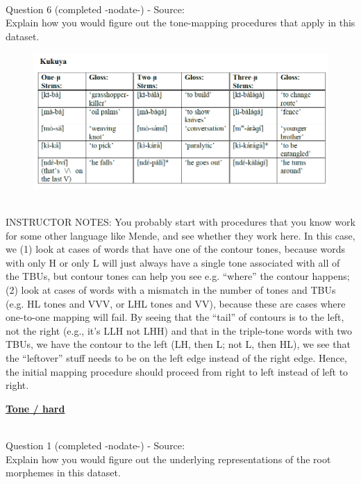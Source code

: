\documentclass[12pt]{article}
\begin{document}
~\\

{\large Question 6} (completed -nodate-) - Source: \\

Explain how you would figure out the tone-mapping procedures that apply in this dataset.\\

\begin{figure}[H]
\includegraphics{../images/kukuya.png}
\end{figure}

~\\
INSTRUCTOR NOTES: You probably start with procedures that you know work for some other language like Mende, and see whether they work here. In this case, we (1) look at cases of words that have one of the contour tones, because words with only H or only L will just always have a single tone associated with all of the TBUs, but contour tones can help you see e.g. “where” the contour happens; (2) look at cases of words with a mismatch in the number of tones and TBUs (e.g. HL tones and VVV, or LHL tones and VV), because these are cases where one-to-one mapping will fail. By seeing that the “tail” of contours is to the left, not the right (e.g., it’s LLH not LHH) and that in the triple-tone words with two TBUs, we have the contour to the left (LH, then L; not L, then HL), we see that the “leftover” stuff needs to be on the left edge instead of the right edge. Hence, the initial mapping procedure should proceed from right to left instead of left to right.


\newpage\textbf{\underline{\huge Tone / hard\\}}

~\\

{\large Question 1} (completed -nodate-) - Source: \\

Explain how you would figure out the underlying representations of the root morphemes in this dataset.\\
\end{document}

